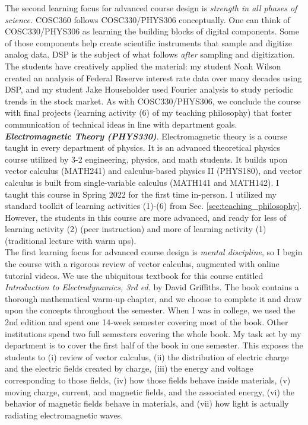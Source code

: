 \documentclass[../../../main.tex]{subfiles}
\begin{document}
The second learning focus for advanced course design is \textit{strength in all phases of science.}  COSC360 follows COSC330/PHYS306 conceptually.  One can think of COSC330/PHYS306 as learning the building blocks of digital components.  Some of those components help create scientific instruments that sample and digitize analog data.  DSP is the subject of what follows \textit{after} sampling and digitization.  The students have creatively applied the material: my student Noah Wilson created an analysis of Federal Reserve interest rate data over many decades using DSP, and my student Jake Householder used Fourier analysis to study periodic trends in the stock market.  As with COSC330/PHYS306, we conclude the course with final projects (learning activity (6) of my teaching philosophy) that foster communication of technical ideas in line with department goals.
\\
\vspace{0.25cm}
\textbf{\textit{Electromagnetic Theory (PHYS330)}}.  Electromagnetic theory is a course taught in every department of physics.  It is an advanced theoretical physics course utilized by 3-2 engineering, physics, and math students.  It builds upon vector calculus (MATH241) and calculus-based physics II (PHYS180), and vector calculus is built from single-variable calculus (MATH141 and MATH142).  I taught this course in Spring 2022 for the first time in-person.  I utilized my standard toolkit of learning activities (1)-(6) from Sec. \ref{sec:teaching_philosophy}.  However, the students in this course are more advanced, and ready for less of learning activity (2) (peer instruction) and more of learning activity (1) (traditional lecture with warm ups).
\\
\vspace{0.25cm}
The first learning focus for advanced course design is \textit{mental discipline}, so I begin the course with a rigorous review of vector calculus, augmented with online tutorial videos.  We use the ubiquitous textbook for this course entitled \textit{Introduction to Electrodynamics, 3rd ed.} by David Griffiths.  The book contains a thorough mathematical warm-up chapter, and we choose to complete it and draw upon the concepts throughout the semester.  When I was in college, we used the 2nd edition and spent one 14-week semester covering most of the book.  Other institutions spend two full semesters covering the whole book.  My task set by my department is to cover the first half of the book in one semester.  This exposes the students to (i) review of vector calculus, (ii) the distribution of electric charge and the electric fields created by charge, (iii) the energy and voltage corresponding to those fields, (iv) how those fields behave inside materials, (v) moving charge, current, and magnetic fields, and the associated energy, (vi) the behavior of magnetic fields behave in materials, and (vii) how light is actually radiating electromagnetic waves.
\end{document}
